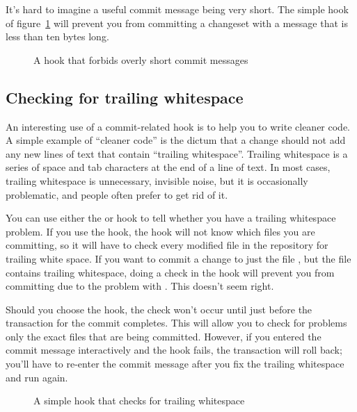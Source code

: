 It's hard to imagine a useful commit message being very short.  The
simple  hook of figure~\ref{ex:hook:msglen.go}
will prevent you from committing a changeset with a message that is
less than ten bytes long.

\begin{figure}[ht]
  \caption{A hook that forbids overly short commit messages}
  \label{ex:hook:msglen.go}
\end{figure}

\subsection{Checking for trailing whitespace}

An interesting use of a commit-related hook is to help you to write
cleaner code.  A simple example of ``cleaner code'' is the dictum that
a change should not add any new lines of text that contain ``trailing
whitespace''.  Trailing whitespace is a series of space and tab
characters at the end of a line of text.  In most cases, trailing
whitespace is unnecessary, invisible noise, but it is occasionally
problematic, and people often prefer to get rid of it.

You can use either the  or  hook to
tell whether you have a trailing whitespace problem.  If you use the
 hook, the hook will not know which files you are
committing, so it will have to check every modified file in the
repository for trailing white space.  If you want to commit a change
to just the file , but the file  contains
trailing whitespace, doing a check in the  hook will
prevent you from committing  due to the problem with
.  This doesn't seem right.

Should you choose the  hook, the check won't occur
until just before the transaction for the commit completes.  This will
allow you to check for problems only the exact files that are being
committed.  However, if you entered the commit message interactively
and the hook fails, the transaction will roll back; you'll have to
re-enter the commit message after you fix the trailing whitespace and
run  again.

\begin{figure}[ht]
  \caption{A simple hook that checks for trailing whitespace}
  \label{ex:hook:ws.simple}
\end{figure}

